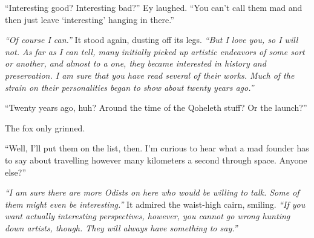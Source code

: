 ``Interesting good? Interesting bad?'' Ey laughed. ``You can't call them mad and then just leave `interesting' hanging in there.''

\emph{``Of course I can.''} It stood again, dusting off its legs. \emph{``But I love you, so I will not. As far as I can tell, many initially picked up artistic endeavors of some sort or another, and almost to a one, they became interested in history and preservation. I am sure that you have read several of their works. Much of the strain on their personalities began to show about twenty years ago.''}

``Twenty years ago, huh? Around the time of the Qoheleth stuff? Or the launch?''

The fox only grinned.

``Well, I'll put them on the list, then. I'm curious to hear what a mad founder has to say about travelling however many kilometers a second through space. Anyone else?''

\emph{``I am sure there are more Odists on here who would be willing to talk. Some of them might even be interesting.''} It admired the waist-high cairn, smiling. \emph{``If you want actually interesting perspectives, however, you cannot go wrong hunting down artists, though. They will always have something to say.''}
